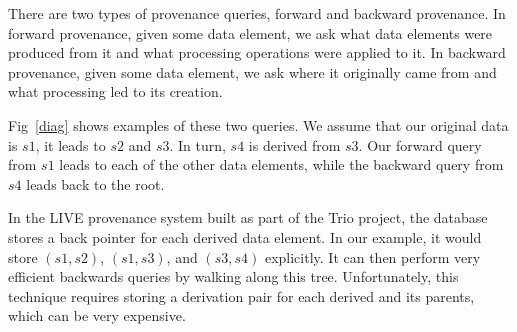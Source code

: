 \documentclass[11pt]{article}
\begin{document}
% 
% 
% 
% 
% 
% 


There are two types of provenance queries, forward and backward provenance. In forward provenance, given some data element, we ask what data elements were produced from it and what processing operations were applied to it. In backward provenance, given some data element, we ask where it originally came from and what processing led to its creation. 

Fig~\ref{diag} shows examples of these two queries. We assume that our original data is $s1$, it leads to $s2$ and $s3$. In turn, $s4$ is derived from $ s3$. Our forward query from $ s1$ leads to each of the other data elements, while the backward query from  $s4$ leads back to the root.  

In the LIVE provenance system built as part of the Trio project, the database stores a back pointer for each derived data element. In our example, it would store $(s1, s2)$, $(s1, s3)$, and $(s3, s4)$ explicitly. It can then perform very efficient backwards queries by walking along this tree. Unfortunately, this technique requires storing a derivation pair for each derived and its parents, which can be very expensive.  
\end{document}

